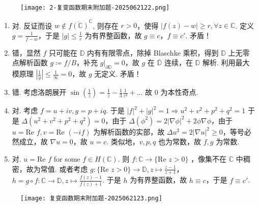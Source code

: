 \begin{figure}[H]
\centering
\texttt{[image: 2-复变函数期末附加题-2025062122.png]}
\label{}
\end{figure}

\begin{enumerate}
	\item 对. 反证而设 $w\not\in \overline{f(\mathbb{C})}^{\mathbb{C}}$, 则存在 $r>0$，使得 $\lvert f (z)-w \rvert\geq r,\forall z\in \mathbb{C}$. 定义 $g=\frac{1}{f-w}$，于是 $\lvert g \rvert\leq\frac{1}{r}$ 为有界整函数，故 $g\equiv c$，$f\equiv c'$. 矛盾！
	\item 错，显然 $f$ 只可能在 $\mathbb{D}$ 内有有限零点，除掉 Blaschke 乘积，得到 $\mathbb{D}$ 上无零点解析函数 $g\coloneqq f/B$，补充 $\left.g\right|_{\partial \mathbb{D}}=0$，故 $g$ 在 $\overline{\mathbb{D}}$ 连续，在 $\mathbb{D}$ 解析. 利用最大模原理 $\left\lvert  \frac{1}{g}  \right\rvert\leq\frac{1}{\infty}=0$，故 $g$ 无定义. 矛盾！
	\item 错. 考虑洛朗展开 $\sin\left( \frac{1}{z} \right)=\frac{1}{z}-\frac{1}{3}\frac{1}{z^{3}}+\dots$ 故 0 为本性奇点.
	\item 对. 考虑 $f=u+iv,g=p+iq$. 于是 $\lvert f \rvert ^{2}+\lvert g \rvert ^{2}=1\Rightarrow u^{2}+v^{2}+p^{2}+q^{2}=1$ 于是 $\Delta(u^{2}+v^{2}+p^{2}+q^{2})=0$，由于 $\Delta(\phi^{2})=2\lvert \nabla \phi \rvert ^{2}+2\phi \nabla \phi$，由于 $u=\text{Re }f,v=\text{Re }(-if)$ 为解析函数的实部，故 $\Delta u^{2}=2\lvert \nabla u \rvert ^{2}\geq0$，等号必然成立，故 $\nabla u=0$，故 $u=c$. 类似地，$v,p,q$ 也为常数，故 $f,g$ 为常数.
	\item 对. $u=\text{Re }f$ for some $f\in H(\mathbb{C})$. 则 $f:\mathbb{C}\to \{ \text{Re }z>0 \}$ ，像集不在 $\mathbb{C}$ 中稠密，故为常值. 或者考虑 $g:\{ \text{Re }z>0 \}\to \mathbb{D},z\mapsto\frac{z-1}{z+1}$，$h=g\circ f:\mathbb{C}\to \mathbb{D},z\mapsto\frac{f(z)-1}{f(z)+1}$. 于是 $h$ 为有界整函数，故 $h\equiv c$，于是 $f\equiv c'$.
\end{enumerate}

\begin{figure}[H]
\centering
\texttt{[image: 复变函数期末附加题-2025062123.png]}
\label{}
\end{figure}

